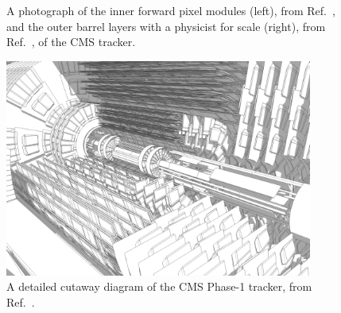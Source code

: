 \begin{figure}[htb]
    \centering
    \quad
    \caption{
        A photograph of the inner forward pixel modules (left), from Ref.~\cite{Hoch:2017264}, and the outer barrel layers with a physicist for scale (right), from Ref.~\cite{Maximilien:995912}, of the CMS tracker. 
    }
    \label{fig:cms_tracker_pictures}
\end{figure}

\begin{figure}[htb]
    \centering
    \includegraphics[width=0.9\textwidth,valign=c]{fig/cms/tracker_detailed.png}
    \caption{
        A detailed cutaway diagram of the CMS Phase-1 tracker, from Ref.~\cite{Sakuma:2630160}. 
    }
    \label{fig:cms_tracker_layout}
\end{figure}

